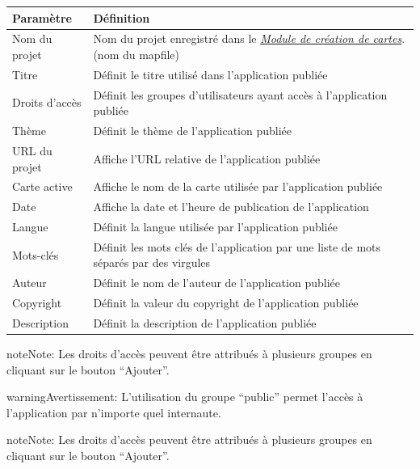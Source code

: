 \documentclass[letterpaper,10pt,french]{sphinxmanual}
\begin{document}
\begin{tabulary}{\linewidth}{|L|L|}
\hline

\textbf{Paramètre}
 & 
\textbf{Définition}
\\
\hline
Nom du projet
 & 
Nom du projet enregistré dans le {\hyperref[maps/index::doc]{\emph{\emph{Module de création de cartes}}}}. (nom du mapfile)
\\
\hline
Titre
 & 
Définit le titre utilisé dans l'application publiée
\\
\hline
Droits d'accès
 & 
Définit les groupes d'utilisateurs ayant accès à l'application publiée
\\
\hline
Thème
 & 
Définit le thème de l'application publiée
\\
\hline
URL du projet
 & 
Affiche l'URL relative de l'application publiée
\\
\hline
Carte active
 & 
Affiche le nom de la carte utilisée par l'application publiée
\\
\hline
Date
 & 
Affiche la date et l'heure de publication de l'application
\\
\hline
Langue
 & 
Définit la langue utilisée par l'application publiée
\\
\hline
Mots-clés
 & 
Définit les mots clés de l'application par une liste de mots séparés par des virgules
\\
\hline
Auteur
 & 
Définit le nom de l'auteur de l'application publiée
\\
\hline
Copyright
 & 
Définit la valeur du copyright de l'application publiée
\\
\hline
Description
 & 
Définit la description de l'application publiée
\\
\hline\end{tabulary}


\begin{notice}{note}{Note:}
Les droits d'accès peuvent être attribués à plusieurs groupes en cliquant sur le bouton ``Ajouter''.
\end{notice}

\begin{notice}{warning}{Avertissement:}
L'utilisation du groupe ``public'' permet l'accès à l'application par n'importe quel internaute.
\end{notice}

\begin{notice}{note}{Note:}
Les droits d'accès peuvent être attribués à plusieurs groupes en cliquant sur le bouton ``Ajouter''.
\end{notice}
\end{document}
